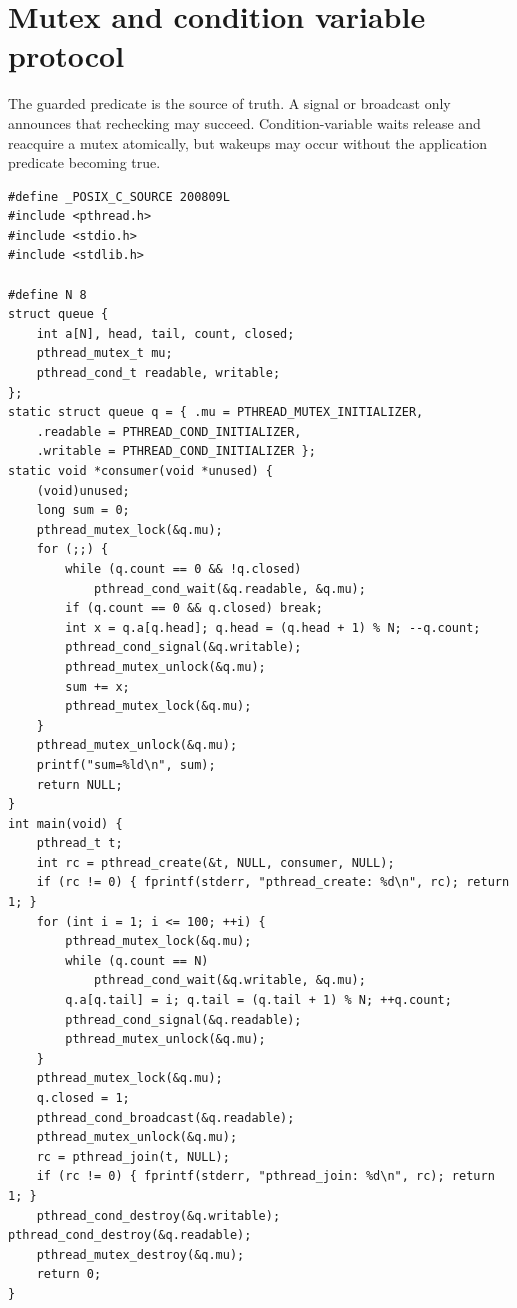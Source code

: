 \documentclass[11pt,letterpaper,oneside]{report}
\begin{document}
\chapter{Mutex and condition variable protocol}
The guarded predicate is the source of truth. A signal or broadcast only announces that rechecking may succeed. Condition-variable waits release and reacquire a mutex atomically, but wakeups may occur without the application predicate becoming true.

\begin{lstlisting}
#define _POSIX_C_SOURCE 200809L
#include <pthread.h>
#include <stdio.h>
#include <stdlib.h>

#define N 8
struct queue {
    int a[N], head, tail, count, closed;
    pthread_mutex_t mu;
    pthread_cond_t readable, writable;
};
static struct queue q = { .mu = PTHREAD_MUTEX_INITIALIZER,
    .readable = PTHREAD_COND_INITIALIZER,
    .writable = PTHREAD_COND_INITIALIZER };
static void *consumer(void *unused) {
    (void)unused;
    long sum = 0;
    pthread_mutex_lock(&q.mu);
    for (;;) {
        while (q.count == 0 && !q.closed)
            pthread_cond_wait(&q.readable, &q.mu);
        if (q.count == 0 && q.closed) break;
        int x = q.a[q.head]; q.head = (q.head + 1) % N; --q.count;
        pthread_cond_signal(&q.writable);
        pthread_mutex_unlock(&q.mu);
        sum += x;
        pthread_mutex_lock(&q.mu);
    }
    pthread_mutex_unlock(&q.mu);
    printf("sum=%ld\n", sum);
    return NULL;
}
int main(void) {
    pthread_t t;
    int rc = pthread_create(&t, NULL, consumer, NULL);
    if (rc != 0) { fprintf(stderr, "pthread_create: %d\n", rc); return 1; }
    for (int i = 1; i <= 100; ++i) {
        pthread_mutex_lock(&q.mu);
        while (q.count == N)
            pthread_cond_wait(&q.writable, &q.mu);
        q.a[q.tail] = i; q.tail = (q.tail + 1) % N; ++q.count;
        pthread_cond_signal(&q.readable);
        pthread_mutex_unlock(&q.mu);
    }
    pthread_mutex_lock(&q.mu);
    q.closed = 1;
    pthread_cond_broadcast(&q.readable);
    pthread_mutex_unlock(&q.mu);
    rc = pthread_join(t, NULL);
    if (rc != 0) { fprintf(stderr, "pthread_join: %d\n", rc); return 1; }
    pthread_cond_destroy(&q.writable); pthread_cond_destroy(&q.readable);
    pthread_mutex_destroy(&q.mu);
    return 0;
}
\end{lstlisting}
\end{document}
